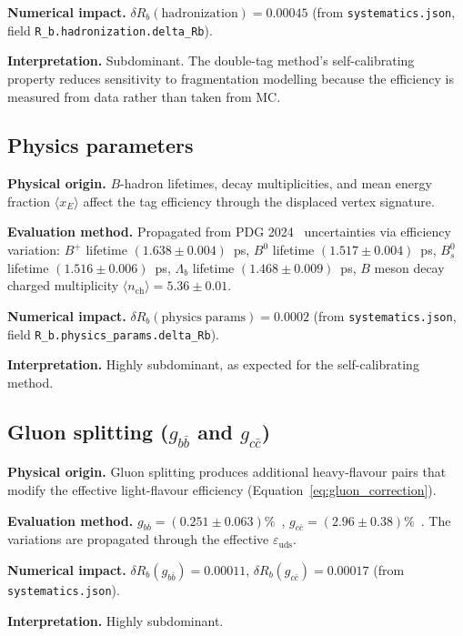 \documentclass[11pt,a4paper]{article}
\begin{document}
\textbf{Numerical impact.}
$\delta R_b(\mathrm{hadronization}) = 0.00045$
(from \texttt{systematics.json}, field \texttt{R\_b.hadronization.delta\_Rb}).

\textbf{Interpretation.} Subdominant. The double-tag method's self-calibrating property
reduces sensitivity to fragmentation modelling because the efficiency is measured from
data rather than taken from MC.

\subsection{Physics parameters}
\label{sec:syst_physics}

\textbf{Physical origin.} $B$-hadron lifetimes, decay multiplicities, and mean energy
fraction $\langle x_E \rangle$ affect the tag efficiency through the displaced vertex
signature.

\textbf{Evaluation method.} Propagated from PDG 2024~\cite{PDG:2024} uncertainties
via efficiency variation:
$B^+$ lifetime $(1.638 \pm 0.004)$~ps,
$B^0$ lifetime $(1.517 \pm 0.004)$~ps,
$B_s^0$ lifetime $(1.516 \pm 0.006)$~ps,
$\Lambda_b$ lifetime $(1.468 \pm 0.009)$~ps,
$B$ meson decay charged multiplicity $\langle n_\mathrm{ch} \rangle = 5.36 \pm 0.01$.

\textbf{Numerical impact.}
$\delta R_b(\mathrm{physics\;params}) = 0.0002$
(from \texttt{systematics.json}, field \texttt{R\_b.physics\_params.delta\_Rb}).

\textbf{Interpretation.} Highly subdominant, as expected for the self-calibrating method.

\subsection{Gluon splitting ($g_{b\bar{b}}$ and $g_{c\bar{c}}$)}
\label{sec:syst_gluon}

\textbf{Physical origin.} Gluon splitting produces additional heavy-flavour pairs
that modify the effective light-flavour efficiency (Equation~\ref{eq:gluon_correction}).

\textbf{Evaluation method.}
$g_{b\bar{b}} = (0.251 \pm 0.063)\%$~\cite{LEP:HF:2001},
$g_{c\bar{c}} = (2.96 \pm 0.38)\%$~\cite{LEP:gcc}.
The variations are propagated through the effective $\varepsilon_\mathrm{uds}$.

\textbf{Numerical impact.}
$\delta R_b(g_{b\bar{b}}) = 0.00011$,
$\delta R_b(g_{c\bar{c}}) = 0.00017$
(from \texttt{systematics.json}).

\textbf{Interpretation.} Highly subdominant.
\end{document}

